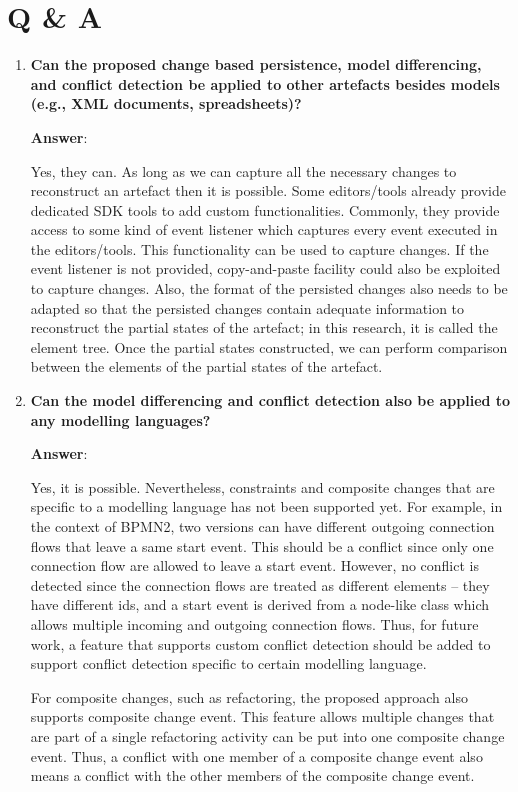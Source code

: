 \chapter{Q \& A}
\label{sec:qna}

\begin{enumerate}
  \item \textbf{Can the proposed change based persistence, model differencing, and conflict detection be applied to other artefacts besides models (e.g., XML documents, spreadsheets)?}
  
  \textbf{Answer}:
  
  Yes, they can. As long as we can capture all the necessary changes to reconstruct an artefact then it is possible. Some editors/tools already provide dedicated SDK tools to add custom functionalities.  Commonly, they provide access to some kind of event listener which captures every event executed in the editors/tools. This functionality can be used to capture changes. If the event listener is not provided, copy-and-paste facility could also be exploited to capture changes. Also, the format of the persisted changes also needs to be adapted so that the persisted changes contain adequate information to reconstruct the partial states of the artefact; in this research, it is called the element tree. Once the partial states constructed, we can perform comparison between the elements of the partial states of the artefact.
  
  \item \textbf{Can the model differencing and conflict detection also be applied to any modelling languages?}
  
  \textbf{Answer}:
  
  Yes, it is possible. Nevertheless, constraints and composite changes that are specific to a modelling language has not been supported yet. For example, in the context of BPMN2, two versions can have different outgoing connection flows that leave a same start event. This should be a conflict since only one connection flow are allowed to leave a start event. However, no conflict is detected since the connection flows are treated as different elements -- they have different ids, and a start event is derived from a node-like class which allows multiple incoming and outgoing connection flows. Thus, for future work, a feature that supports custom conflict detection should be added to support conflict detection specific to certain modelling language.
  
  For composite changes, such as refactoring, the proposed approach also supports composite change event. This feature allows multiple changes that are part of a single refactoring activity can be put into one composite change event. Thus, a conflict with one member of a composite change event also means a conflict with the other members of the composite change event.
  

\end{enumerate}
